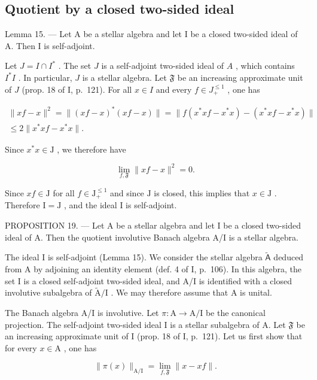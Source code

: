 \subsection{Quotient by a closed two-sided ideal}

Lemma 15. --- Let A be a stellar algebra and let I be a closed two-sided ideal of A. Then I is self-adjoint.

Let \(J = I \cap I^*\) . The set \(J\) is a self-adjoint two-sided ideal of \(A\) , which contains \(I^*I\) . In particular, \(J\) is a stellar algebra. Let \(\mathfrak{F}\) be an increasing approximate unit of \(J\) (prop. 18 of I, p.~121). For all \(x \in I\) and every \(f \in J_{+}^{\leqslant 1}\) , one has

\[
\begin{array}{c} \| x f - x \| ^ {2} = \| (x f - x) ^ {*} (x f - x) \| = \| f (x ^ {*} x f - x ^ {*} x) - (x ^ {*} x f - x ^ {*} x) \| \\ \leqslant 2 \| x ^ {*} x f - x ^ {*} x \|. \end{array}
\]

Since \(x^{*}x\in \mathrm{J}\) , we therefore have

\[
\lim _ {f, \mathfrak {F}} \| x f - x \| ^ {2} = 0.
\]

Since \(xf \in \mathrm{J}\) for all \(f \in \mathrm{J}_{+}^{\leqslant 1}\) and since \(\mathrm{J}\) is closed, this implies that \(x \in \mathrm{J}\) . Therefore \(\mathrm{I} = \mathrm{J}\) , and the ideal \(\mathrm{I}\) is self-adjoint.

PROPOSITION 19. --- Let A be a stellar algebra and let I be a closed two-sided ideal of A. Then the quotient involutive Banach algebra A/I is a stellar algebra.

The ideal I is self-adjoint (Lemma 15). We consider the stellar algebra \(\widetilde{\mathsf{A}}\) deduced from A by adjoining an identity element (def. 4 of I, p.~106). In this algebra, the set I is a closed self-adjoint two-sided ideal, and A/I is identified with a closed involutive subalgebra of \(\widetilde{\mathrm{A}}/\mathrm{I}\) . We may therefore assume that A is unital.

The Banach algebra A/I is involutive. Let \(\pi\colon\mathrm{A}\to\mathrm{A}/\mathrm{I}\) be the canonical projection. The self-adjoint two-sided ideal I is a stellar subalgebra of A. Let \(\mathfrak{F}\) be an increasing approximate unit of I (prop. 18 of I, p.~121). Let us first show that for every \(x\in\mathrm{A}\) , one has

\[
\| \pi (x) \| _ {\mathrm{A/I}} = \lim _ {f, \mathfrak {F}} \| x - x f \|.\tag{6}
\]

